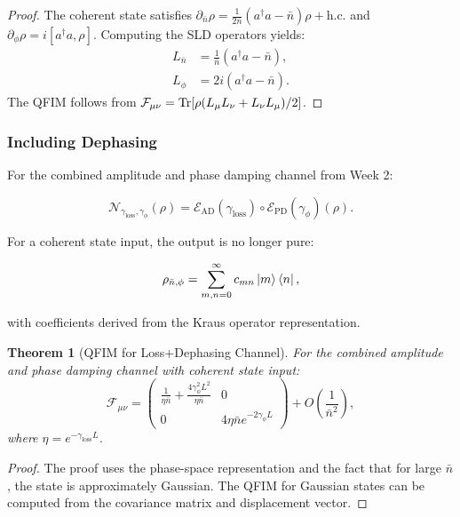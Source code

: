 \documentclass[12pt]{article}
\newtheorem{theorem}{Theorem}[section]
\newcommand{\calN}{\mathcal{N}}
\begin{document}
\begin{proof}
The coherent state satisfies \(\partial_{\bar{n}}\rho = \frac{1}{2\bar{n}}(a^\dagger a - \bar{n})\rho + \text{h.c.}\) and \(\partial_\phi\rho = i[a^\dagger a,\rho]\). Computing the SLD operators yields:
\begin{align}
    L_{\bar{n}} &= \frac{1}{\bar{n}}(a^\dagger a - \bar{n}), \\
    L_\phi &= 2i(a^\dagger a - \bar{n}).
\end{align}
The QFIM follows from \(\mathcal{F}_{\mu\nu} = \Tr[\rho (L_\mu L_\nu + L_\nu L_\mu)/2]\).
\end{proof}

\subsubsection{Including Dephasing}

For the combined amplitude and phase damping channel from Week 2:

\begin{equation}
    \calN_{\gamma_{\text{loss}},\gamma_\phi}(\rho) = \mathcal{E}_{\text{AD}}(\gamma_{\text{loss}}) \circ \mathcal{E}_{\text{PD}}(\gamma_\phi)(\rho).
\end{equation}

For a coherent state input, the output is no longer pure:

\begin{equation}
    \rho_{\bar{n},\phi} = \sum_{m,n=0}^\infty c_{mn} \ket{m}\bra{n},
\end{equation}

with coefficients derived from the Kraus operator representation.

\begin{theorem}[QFIM for Loss+Dephasing Channel]
For the combined amplitude and phase damping channel with coherent state input:
\begin{equation}
    \mathcal{F}_{\mu\nu} = \begin{pmatrix}
        \frac{1}{\eta\bar{n}} + \frac{4\gamma_\phi^2 L^2}{\eta\bar{n}} & 0 \\
        0 & 4\eta\bar{n} e^{-2\gamma_\phi L}
    \end{pmatrix} + O\left(\frac{1}{\bar{n}^2}\right),
\end{equation}
where \(\eta = e^{-\gamma_{\text{loss}}L}\).
\end{theorem}

\begin{proof}
The proof uses the phase-space representation and the fact that for large \(\bar{n}\), the state is approximately Gaussian. The QFIM for Gaussian states can be computed from the covariance matrix and displacement vector.
\end{proof}
\end{document}
